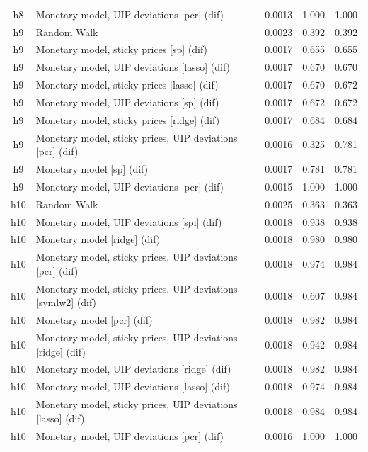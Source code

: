\begin{ThreePartTable}
\begin{longtable}[t]{cp{5.5cm}ccc}
h8 & \raggedright Monetary model, UIP deviations [pcr] (dif) & 0.0013 & 1.000 & 1.000\\
\addlinespace
h9 & \raggedright Random Walk & 0.0023 & 0.392 & 0.392\\
h9 & \raggedright Monetary model, sticky prices [sp] (dif) & 0.0017 & 0.655 & 0.655\\
h9 & \raggedright Monetary model, UIP deviations [lasso] (dif) & 0.0017 & 0.670 & 0.670\\
h9 & \raggedright Monetary model, sticky prices [lasso] (dif) & 0.0017 & 0.670 & 0.672\\
h9 & \raggedright Monetary model, UIP deviations [sp] (dif) & 0.0017 & 0.672 & 0.672\\
h9 & \raggedright Monetary model, sticky prices [ridge] (dif) & 0.0017 & 0.684 & 0.684\\
h9 & \raggedright Monetary model, sticky prices, UIP deviations [pcr] (dif) & 0.0016 & 0.325 & 0.781\\
h9 & \raggedright Monetary model [sp] (dif) & 0.0017 & 0.781 & 0.781\\
h9 & \raggedright Monetary model, UIP deviations [pcr] (dif) & 0.0015 & 1.000 & 1.000\\
\addlinespace
h10 & \raggedright Random Walk & 0.0025 & 0.363 & 0.363\\
h10 & \raggedright Monetary model, UIP deviations [spi] (dif) & 0.0018 & 0.938 & 0.938\\
h10 & \raggedright Monetary model [ridge] (dif) & 0.0018 & 0.980 & 0.980\\
h10 & \raggedright Monetary model, sticky prices, UIP deviations [pcr] (dif) & 0.0018 & 0.974 & 0.984\\
h10 & \raggedright Monetary model, sticky prices, UIP deviations [svmlw2] (dif) & 0.0018 & 0.607 & 0.984\\
h10 & \raggedright Monetary model [pcr] (dif) & 0.0018 & 0.982 & 0.984\\
h10 & \raggedright Monetary model, sticky prices, UIP deviations [ridge] (dif) & 0.0018 & 0.942 & 0.984\\
h10 & \raggedright Monetary model, UIP deviations [ridge] (dif) & 0.0018 & 0.982 & 0.984\\
h10 & \raggedright Monetary model, UIP deviations [lasso] (dif) & 0.0018 & 0.974 & 0.984\\
h10 & \raggedright Monetary model, sticky prices, UIP deviations [lasso] (dif) & 0.0018 & 0.984 & 0.984\\
h10 & \raggedright Monetary model, UIP deviations [pcr] (dif) & 0.0016 & 1.000 & 1.000\\

\end{longtable}
\end{ThreePartTable}
